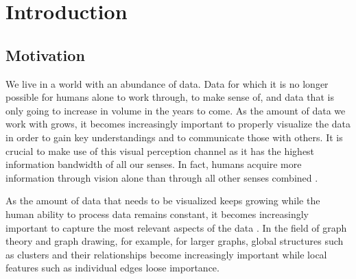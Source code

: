 \chapter{Introduction}
\label{chap:introduction}


\section{Motivation}
\label{sect:motivation}

We live in a world with an abundance of data. Data for which it is no longer possible for humans alone to work through, to make sense of, and data that is only going to increase in volume in the years to come. As the amount of data we work with grows, it becomes increasingly important to properly visualize the data in order to gain key understandings and to communicate those with others. It is crucial to make use of this visual perception channel as it has the highest information bandwidth of all our senses. In fact, humans acquire more information through vision alone than through all other senses combined \cite{ware2019information}.

As the amount of data that needs to be visualized keeps growing while the human ability to process data remains constant, it becomes increasingly important to capture the most relevant aspects of the data \cite{dachsbacher2019visualisierung}. In the field of graph theory and graph drawing, for example, for larger graphs, global structures such as clusters and their relationships become increasingly important while local features such as individual edges loose importance.


